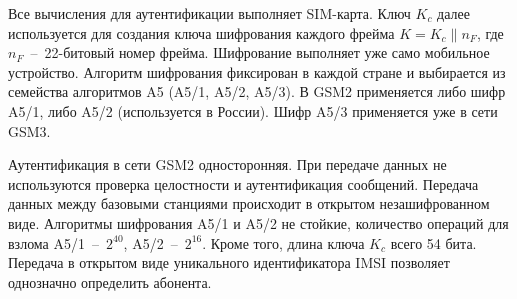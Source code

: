 Все вычисления для аутентификации выполняет SIM-карта. Ключ $K_c$ далее используется для создания ключа шифрования каждого фрейма $K = K_c \| n_F$, где $n_F$~--~22-битовый номер фрейма. Шифрование выполняет уже само мобильное устройство. Алгоритм шифрования фиксирован в каждой стране и выбирается из семейства алгоритмов A5 (A5/1, A5/2, A5/3). В GSM2 применяется либо шифр A5/1, либо A5/2 (используется в России). Шифр A5/3 применяется уже в сети GSM3.

Аутентификация в сети GSM2 односторонняя. При передаче данных не используются проверка целостности и аутентификация сообщений. Передача данных между базовыми станциями происходит в открытом незашифрованном виде. Алгоритмы шифрования A5/1 и A5/2 не стойкие, количество операций для взлома A5/1~--~$2^{40}$, A5/2~--~$2^{16}$. Кроме того, длина ключа $K_c$ всего 54 бита. Передача в открытом виде уникального идентификатора IMSI позволяет однозначно определить абонента.
